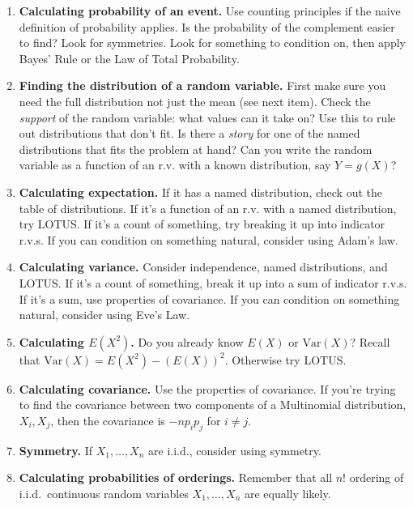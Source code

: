 \documentclass[10pt,landscape]{article}
\newcommand{\var}{\textrm{Var}}
\begin{document}
\begin{multicols*}{3}
\begin{enumerate}
\item \textbf{Calculating probability of an event.} Use counting principles if the naive definition of probability applies. Is the probability of the complement easier to find? Look for symmetries. Look for something to condition on, then apply Bayes' Rule or the Law of Total Probability.

\item \textbf{Finding the distribution of a random variable.} First make sure you need the full distribution not just the mean (see next item). Check the \emph{support} of the random variable: what values can it take on? Use this to rule out distributions that don't fit. Is there a     \emph{story} for one of the named distributions that fits the problem at hand? Can you write the random variable as a function of an r.v. with a known distribution, say $Y = g(X)$?

\item \textbf{Calculating expectation.} If it has a named distribution, check out the table of distributions. If it's a function of an r.v. with a named distribution, try LOTUS. If it's a count of something, try breaking it up into indicator r.v.s. If you can condition on something natural, consider using Adam's law.

\item \textbf{Calculating variance.} Consider independence, named distributions, and LOTUS. If it's a count of something, break it up into a sum of indicator r.v.s. If it's a sum, use properties of covariance. If you can condition on something natural, consider using Eve's Law.

\item \textbf{Calculating $E(X^2)$.}  Do you already know $E(X)$ or $\var(X)$? Recall that $\var(X) = E(X^2) - (E(X))^2$. Otherwise try LOTUS.

\item \textbf{Calculating covariance.} Use the properties of covariance. If you're trying to find the covariance between two components of a Multinomial distribution, $X_i, X_j$, then the covariance is $-np_ip_j$ for $i \neq j$.

\item \textbf{Symmetry.} If $X_1,\dots,X_n$ are i.i.d., consider using symmetry.

\item \textbf{Calculating probabilities of orderings.} Remember that all $n!$ ordering of i.i.d.~continuous random variables $X_1,\dots,X_n$ are equally likely.


\end{enumerate}
\end{multicols*}
\end{document}
